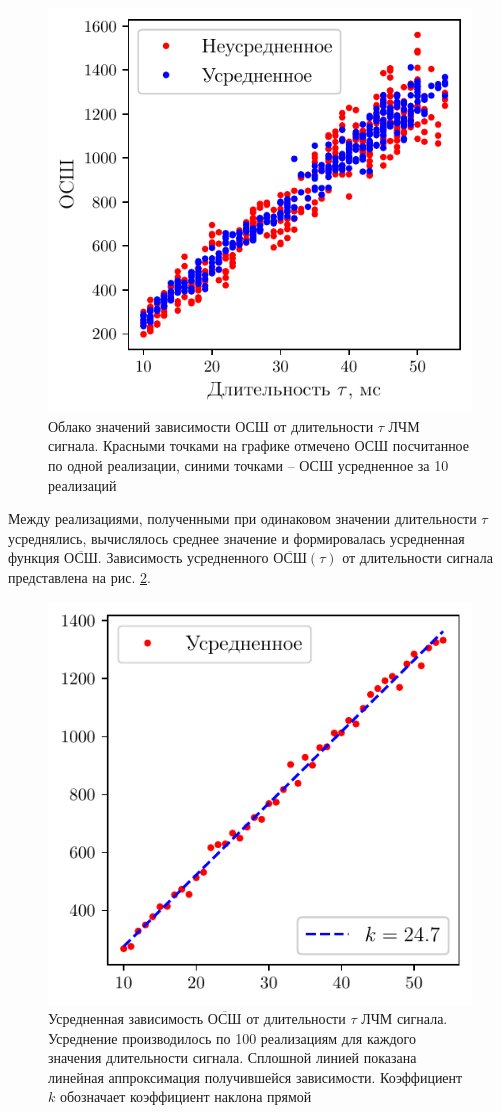 \begin{figure}[h!]
    \centering
    \includegraphics[width=0.6\linewidth]{imgs/task4/t4f1} 
    \caption{Облако значений зависимости ОСШ от длительности $\tau$ ЛЧМ
    сигнала. Красными точками на графике отмечено ОСШ посчитанное по одной
    реализации, синими точками -- ОСШ усредненное за 10 реализаций }
    \label{fig:4.1}
\end{figure}


\newcommand{\mSNR}{\overline{\text{ОСШ}}}
Между реализациями, полученными при одинаковом значении длительности $\tau$
усреднялись, вычислялось среднее значение и формировалась усредненная функция
$\mSNR$. Зависимость усредненного 
$\mSNR(\tau)$ от длительности сигнала представлена на рис. \ref{fig:4.2}.




\begin{figure}[h!]
    \centering
    \includegraphics[width=0.6\linewidth]{imgs/task4/t4f2}
    \caption{Усредненная зависимость $\mSNR$ от длительности $\tau$ ЛЧМ
        сигнала. Усреднение производилось по 100 реализациям для каждого
        значения длительности сигнала.  Сплошной линией показана линейная
        аппроксимация получившейся зависимости. Коэффициент $k$ обозначает
        коэффициент наклона прямой}
    \label{fig:4.2}
\end{figure}


